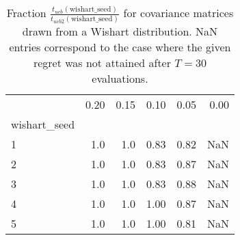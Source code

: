 \begin{table}
\centering
\caption{Fraction $\frac{t_{ucb}(\text{wishart\_seed})}
    {t_{ucb2}(\text{wishart\_seed})}$ for covariance matrices 
    drawn from a Wishart distribution. NaN entries correspond to the 
    case where the given regret was not attained after $T=30$ evaluations.}
\label{fig:wishart_ucb_vs_ucb2}
\begin{tabular}{lrrrrr}
\toprule
{} &  0.20 &  0.15 &  0.10 &  0.05 &  0.00 \\
wishart\_seed &       &       &       &       &       \\
\midrule
1            &   1.0 &   1.0 &  0.83 &  0.82 &   NaN \\
2            &   1.0 &   1.0 &  0.83 &  0.87 &   NaN \\
3            &   1.0 &   1.0 &  0.83 &  0.88 &   NaN \\
4            &   1.0 &   1.0 &  1.00 &  0.87 &   NaN \\
5            &   1.0 &   1.0 &  1.00 &  0.81 &   NaN \\
\bottomrule
\end{tabular}
\end{table}
